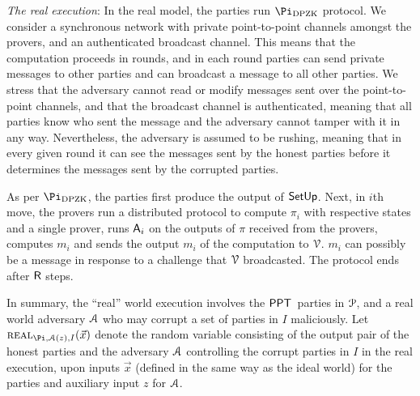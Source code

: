 \noindent\textit{The real execution}: In the real model, the parties run $\Pi_\DPZK$ protocol.  We consider a synchronous network with private point-to-point channels amongst the provers, and an authenticated broadcast channel. This means that the computation proceeds in rounds, and in each round parties can send private messages to other parties and can broadcast a message to all other parties. We stress that the adversary cannot read or modify messages sent over the point-to-point channels, and that the broadcast channel is authenticated, meaning that all parties know who sent the message and the adversary cannot tamper with it in any way. Nevertheless, the adversary is assumed to be rushing, meaning that in every given round it can see the messages sent by the honest parties before it determines the messages sent by the corrupted parties. 

As per $\Pi_\DPZK$, the parties first produce the output of $\mathsf{SetUp}$. Next, in $i$th move,  the  provers run a distributed protocol to compute $\pi_i$ with respective states and a single prover, runs $\mathsf{A}_i$ on the outputs of $\pi$ received from the provers, computes $m_i$ and sends the output $m_i$ of the computation to $\mathcal{V}$. $m_i$ can possibly be  a message in response to a challenge that $\mathcal{V}$ broadcasted. The protocol ends after $\mathsf{R}$ steps.

In summary,  the ``real'' world execution involves the $\mathsf{PPT}$\ parties  in $\mathcal{P}$,  and a real world adversary $\mathcal{A}$ who may corrupt  a set of parties in $I$ maliciously.  Let $\Real_{\Pi, \Adv(z),I}(\vec{x})$ denote the random variable consisting of the output pair of the honest parties and the adversary $\mathcal{A}$ controlling the corrupt parties in $I$ in the real execution, upon inputs $\vec{x}$ (defined in the same way as the ideal world) for the parties and auxiliary input $z$ for $\mathcal{A}$. 

